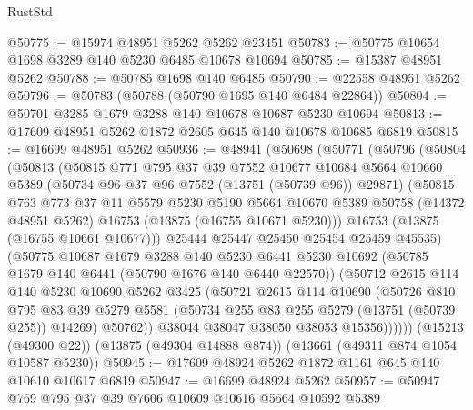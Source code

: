 \begin{lexlean}{RustStd}
\begin{coremodule}
@50775 := @15974 @48951 @5262 @5262 @23451
@50783 := @50775 @10654 @1698 @3289 @140 @5230 @6485 @10678 @10694
@50785 := @15387 @48951 @5262
@50788 := @50785 @1698 @140 @6485
@50790 := @22558 @48951 @5262
@50796 := @50783 (@50788 (@50790 @1695 @140 @6484 @22864))
@50804 := @50701 @3285 @1679 @3288 @140 @10678 @10687 @5230 @10694
@50813 := @17609 @48951 @5262 @1872 @2605 @645 @140 @10678 @10685 @6819
@50815 := @16699 @48951 @5262
@50936 := @48941
    (@50698
      (@50771
        (@50796
          (@50804
            (@50813
              (@50815
                @771
                @795
                @37
                @39
                @7552
                @10677
                @10684
                @5664
                @10660
                @5389
                (@50734 @96 @37 @96 @7552 (@13751 (@50739 @96)) @29871)
                (@50815
                  @763
                  @773
                  @37
                  @11
                  @5579
                  @5230
                  @5190
                  @5664
                  @10670
                  @5389
                  @50758
                  (@14372 @48951 @5262)
                  @16753
                  (@13875 (@16755 @10671 @5230)))
                @16753
                (@13875 (@16755 @10661 @10677)))
              @25444
              @25447
              @25450
              @25454
              @25459
              @45535)
            (@50775
              @10687
              @1679
              @3288
              @140
              @5230
              @6441
              @5230
              @10692
              (@50785 @1679 @140 @6441 (@50790 @1676 @140 @6440 @22570))
              (@50712
                @2615
                @114
                @140
                @5230
                @10690
                @5262
                @3425
                (@50721
                  @2615
                  @114
                  @10690
                  (@50726
                    @810
                    @795
                    @83
                    @39
                    @5279
                    @5581
                    (@50734 @255 @83 @255 @5279 (@13751 (@50739 @255)) @14269)
                    @50762))
                @38044
                @38047
                @38050
                @38053
                @15356))))))
    (@15213 (@49300 @22))
    (@13875 (@49304 @14888 @874))
    (@13661 (@49311 @874 @1054 @10587 @5230))
@50945 := @17609 @48924 @5262 @1872 @1161 @645 @140 @10610 @10617 @6819
@50947 := @16699 @48924 @5262
@50957 := @50947 @769 @795 @37 @39 @7606 @10609 @10616 @5664 @10592 @5389

\end{coremodule}
\end{lexlean}
